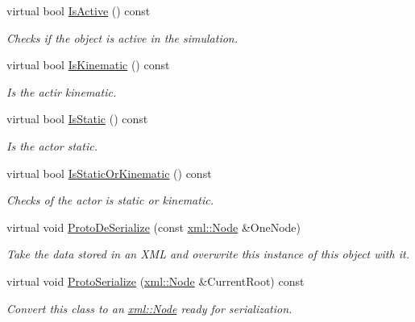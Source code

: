 \begin{DoxyCompactItemize}
virtual bool \hyperlink{classMezzanine_1_1WorldObjectPhysicsSettings_a9933baf62361c7e32eff29dce6219d2c}{IsActive} () const 
\begin{DoxyCompactList}\small\item\em Checks if the object is active in the simulation. \item\end{DoxyCompactList}\item 
virtual bool \hyperlink{classMezzanine_1_1WorldObjectPhysicsSettings_a0c9e2839266e49d073c09d9396eab600}{IsKinematic} () const 
\begin{DoxyCompactList}\small\item\em Is the actir kinematic. \item\end{DoxyCompactList}\item 
virtual bool \hyperlink{classMezzanine_1_1WorldObjectPhysicsSettings_ad66ee17bc6331910a1a1bb583fe2b424}{IsStatic} () const 
\begin{DoxyCompactList}\small\item\em Is the actor static. \item\end{DoxyCompactList}\item 
virtual bool \hyperlink{classMezzanine_1_1WorldObjectPhysicsSettings_adb5ca51d40befb558cc5b1b85ef8b092}{IsStaticOrKinematic} () const 
\begin{DoxyCompactList}\small\item\em Checks of the actor is static or kinematic. \item\end{DoxyCompactList}\item 
virtual void \hyperlink{classMezzanine_1_1WorldObjectPhysicsSettings_a87004034a7ff1c583d842e43b2fedc70}{ProtoDeSerialize} (const \hyperlink{classMezzanine_1_1xml_1_1Node}{xml::Node} \&OneNode)
\begin{DoxyCompactList}\small\item\em Take the data stored in an XML and overwrite this instance of this object with it. \item\end{DoxyCompactList}\item 
virtual void \hyperlink{classMezzanine_1_1WorldObjectPhysicsSettings_acad7197baec929749819b36c5a3985bb}{ProtoSerialize} (\hyperlink{classMezzanine_1_1xml_1_1Node}{xml::Node} \&CurrentRoot) const 
\begin{DoxyCompactList}\small\item\em Convert this class to an \hyperlink{classMezzanine_1_1xml_1_1Node}{xml::Node} ready for serialization. \item\end{DoxyCompactList}\item 

\end{DoxyCompactItemize}
